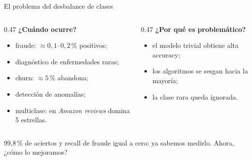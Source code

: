 \documentclass[aspectratio=169,12pt]{beamer}
\newcommand{\colhead}[1]{\textbf{#1}\par\vspace{2pt}}
\begin{document}
\begin{frame}{El problema del desbalance de clases}
  \begin{columns}[T]
    \begin{column}{0.47\textwidth}
      \colhead{¿Cuándo ocurre?}
      \begin{itemize}
        \item fraude: $\approx 0{,}1$--$0{,}2$\,\% positivos;
        \item diagnóstico de enfermedades raras;
        \item churn: $\approx 5$\,\% abandona;
        \item detección de anomalías;
        \item multiclase: en \emph{Amazon reviews} domina 5 estrellas.
      \end{itemize}
    \end{column}
    \begin{column}{0.47\textwidth}
      \colhead{¿Por qué es problemático?}
      \begin{itemize}
        \item el modelo trivial obtiene alta accuracy;
        \item los algoritmos se sesgan hacia la mayoría;
        \item la clase rara queda ignorada.
      \end{itemize}
    \end{column}
  \end{columns}
  \vspace{6pt}
  \begin{keybox}[Recordatorio]
    99,8\,\% de aciertos y recall de fraude igual a cero: ya sabemos medirlo. Ahora, ¿cómo lo mejoramos?
  \end{keybox}
\end{frame}

\end{document}
